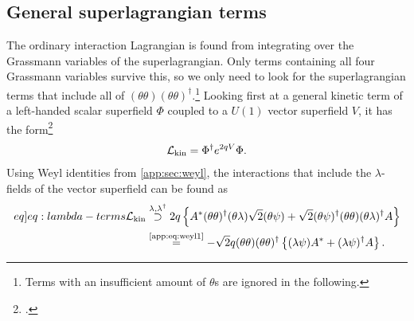 \documentclass[english, notitlepage]{article}
\begin{document}
\subsection{General superlagrangian terms}
The ordinary interaction Lagrangian is found from integrating over the
Grassmann variables of the superlagrangian. Only terms containing all four
Grassmann variables survive this, so we only need to look for the
superlagrangian terms that include all of
$(\theta\theta)(\theta\theta)^\dagger$.\footnote{Terms with an insufficient
    amount of $\theta$s are ignored in the following.} Looking first at a general
kinetic term of a left-handed scalar superfield \(\Phi\) coupled to a $U(1)$
vector superfield \(V\), it has the form\footcite{Binetruy:2006ad}
\begin{align}
    {\mathcal{L}}_\text{kin} = \Phi^\dag e^{2qV} \Phi.
\end{align}
Using Weyl identities from \cref{app:sec:weyl}, the interactions that include the $\lambda$-fields of the vector superfield can be found as
\begin{align}
    \label[eq]{eq:lambda-terms}
    \nonumber
    \msub{\L}{kin} & \stackrel{\lambda, \lambda^\dagger}{\supset} 2q\cclosed{ A^\ast (\theta\theta)^\dagger(\theta\lambda) \sqrt{2} (\theta\psi) + \sqrt{2} (\theta\psi)^\dagger (\theta\theta)(\theta\lambda)^\dagger A } \\
                   & \stackrel{\text{\cref{app:eq:weyl1}}}{=} -\sqrt{2}q (\theta\theta)(\theta\theta)^\dagger \cclosed{ (\lambda\psi)A^\ast + (\lambda\psi)^\dagger A }.
\end{align}
\end{document}
